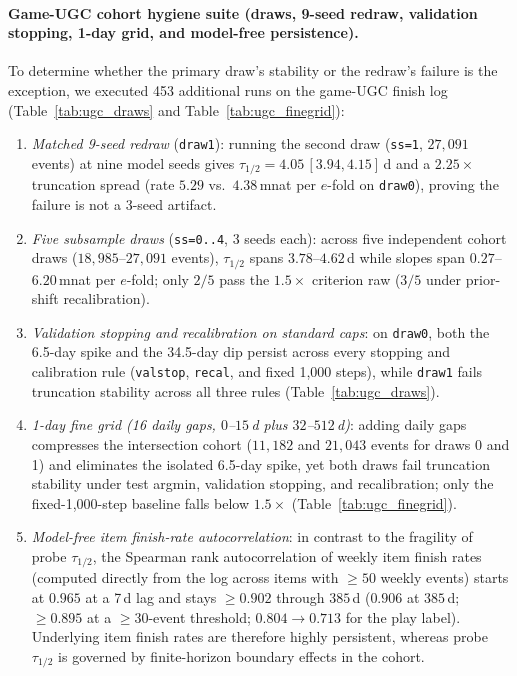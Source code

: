 \documentclass[10pt,letterpaper]{article}
\begin{document}
\paragraph{Game-UGC cohort hygiene suite (draws, 9-seed redraw, validation stopping, 1-day grid, and model-free persistence).}
To determine whether the primary draw's stability or the redraw's failure is the
exception, we executed 453 additional runs on the game-UGC finish log
(Table~\ref{tab:ugc_draws} and Table~\ref{tab:ugc_finegrid}):
\begin{enumerate}
\item \emph{Matched 9-seed redraw} (\texttt{draw1}): running the second draw
      (\texttt{ss=1}, $27{,}091$ events) at nine model seeds gives
      $\tau_{1/2} = 4.05\,[3.94, 4.15]$\,d and a $2.25\times$ truncation spread
      (rate $5.29$ vs.\ $4.38$\,mnat per $e$-fold on \texttt{draw0}), proving
      the failure is not a 3-seed artifact.
\item \emph{Five subsample draws} (\texttt{ss=0..4}, 3 seeds each): across five
      independent cohort draws ($18{,}985$--$27{,}091$ events), $\tau_{1/2}$
      spans $3.78$--$4.62$\,d while slopes span $0.27$--$6.20$\,mnat per
      $e$-fold; only $2/5$ pass the $1.5\times$ criterion raw ($3/5$ under
      prior-shift recalibration).
\item \emph{Validation stopping and recalibration on standard caps}: on
      \texttt{draw0}, both the 6.5-day spike and the 34.5-day dip persist
      across every stopping and calibration rule (\texttt{valstop},
      \texttt{recal}, and fixed 1,000 steps), while \texttt{draw1} fails
      truncation stability across all three rules (Table~\ref{tab:ugc_draws}).
\item \emph{1-day fine grid (16 daily gaps, $0$--$15$\,d plus $32$--$512$\,d)}:
      adding daily gaps compresses the intersection cohort ($11{,}182$ and
      $21{,}043$ events for draws 0 and 1) and eliminates the isolated 6.5-day
      spike, yet both draws fail truncation stability under test argmin,
      validation stopping, and recalibration; only the fixed-1,000-step
      baseline falls below $1.5\times$ (Table~\ref{tab:ugc_finegrid}).
\item \emph{Model-free item finish-rate autocorrelation}: in contrast to the
      fragility of probe $\tau_{1/2}$, the Spearman rank autocorrelation of
      weekly item finish rates (computed directly from the log across items
      with $\ge 50$ weekly events) starts at $0.965$ at a 7\,d lag and stays
      $\ge 0.902$ through $385$\,d ($0.906$ at $385$\,d; $\ge 0.895$ at a
      $\ge 30$-event threshold; $0.804 \to 0.713$ for the play label).
      Underlying item finish rates are therefore highly persistent, whereas
      probe $\tau_{1/2}$ is governed by finite-horizon boundary effects in the
      cohort.
\end{enumerate}
\end{document}
